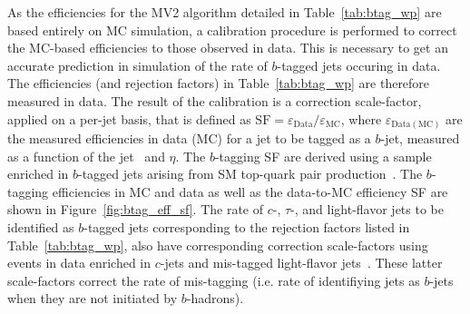 As the efficiencies for the MV2 algorithm detailed in Table~\ref{tab:btag_wp} are based entirely
on MC simulation, a calibration procedure is performed to correct the MC-based efficiencies to
those observed in data.
This is necessary to get an accurate prediction in simulation of the rate of $b$-tagged jets occuring in data.
The efficiencies (and rejection factors) in Table~\ref{tab:btag_wp} are therefore measured in
data.
The result of the calibration is a correction scale-factor, applied on a per-jet basis, that is defined as
$\text{SF} = \varepsilon_{\text{Data}} / \varepsilon_{\text{MC}}$, where $\varepsilon_{\text{Data}(\text{MC})}$
are the measured efficiencies in data (MC) for a jet to be tagged as a $b$-jet, measured as a function of the jet \pT~and $\eta$.
The $b$-tagging SF are derived using a sample enriched in $b$-tagged jets arising from SM top-quark pair production~\cite{FTAG2019}.
The $b$-tagging efficiencies in MC and data as well as the data-to-MC efficiency SF are shown in Figure~\ref{fig:btag_eff_sf}.
The rate of $c$-, $\tau$-, and light-flavor jets to be identified as $b$-tagged jets corresponding to the rejection factors
listed in Table~\ref{tab:btag_wp}, also have corresponding correction scale-factors using events
in data enriched in $c$-jets and mis-tagged light-flavor jets~\cite{FTAG2019,FTAGCJetCalib,FTAGLightFlavorCalib}.
These latter scale-factors correct the rate of mis-tagging (i.e. rate of identifiying jets as $b$-jets when they are
not initiated by $b$-hadrons).

